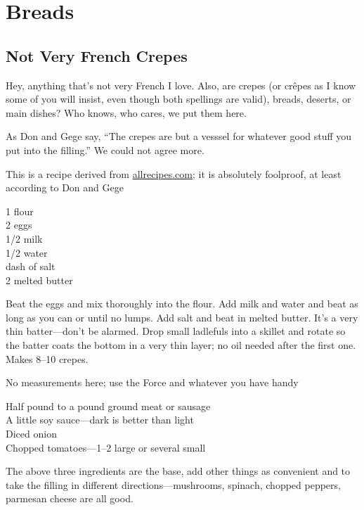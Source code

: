 \chapter{Breads}

\section{Not Very French Crepes}

\begin{open}
    Hey, anything that's not very French I love.  Also, are crepes (or
    cr\^{e}pes as I know some of you will insist, even though both spellings are
    valid), breads, deserts, or main dishes?  Who knows, who cares, we put them
    here.

    As Don and Gege say, ``The crepes are but a vesssel for whatever good stuff
    you put into the filling.''  We could not agree more.

    This is a recipe derived from \url{allrecipes.com}; it is absolutely
    foolproof, at least according to Don and Gege
\end{open}
\begin{ingredients}
    \SI{1}{\cup} flour\\
    2 eggs\\
    \SI{1/2}{\cup} milk\\
    \SI{1/2}{\cup} water\\
    dash of salt\\
    \SI{2}{\tblspoon} melted butter
\end{ingredients}
Beat the eggs and mix thoroughly into the flour. Add milk and water and beat as
long as you can or until no lumps. Add salt and beat in melted butter. It's a
very thin batter---don't be alarmed. Drop small ladlefuls into a skillet and
rotate so the batter coats the bottom in a very thin layer; no oil needed after
the first one. Makes \numrange{8}{10} crepes.


\noindent No measurements here; use the Force and whatever you have handy
\begin{ingredients}
    Half pound to a pound ground meat or sausage\\
    A little soy sauce---dark is better than light\\
    Diced onion\\
    Chopped tomatoes---\numrange{1}{2} large or several small
\end{ingredients}
The above three ingredients are the base, add other things as convenient and to take the filling in different directions---mushrooms, spinach, chopped peppers, parmesan cheese are all good.

